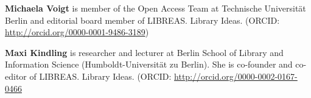 \documentclass[a4paper,
fontsize=11pt,
oneside,
numbers=noperiodatend,
parskip=half-,
bibliography=totoc,
final
]{scrartcl}
\begin{document}
\textbf{Michaela Voigt} is member of the Open Access Team at Technische
Universität Berlin and editorial board member of LIBREAS. Library Ideas.
(ORCID: \url{http://orcid.org/0000-0001-9486-3189})

\textbf{Maxi Kindling} is researcher and lecturer at Berlin School of
Library and Information Science (Humboldt-Universität zu Berlin). She is
co-founder and co-editor of LIBREAS. Library Ideas. (ORCID:
\url{http://orcid.org/0000-0002-0167-0466}
\end{document}
